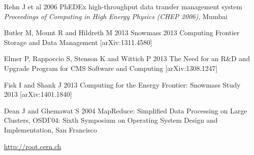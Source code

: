 \documentclass[a4paper]{jpconf}
\begin{document}
\begin{thebibliography}{9}
 Rehn J et al 2006 PhEDEx high-throughput data
  transfer management system {\it Proceedings of Computing in High
    Energy Physics (CHEP 2006)}, Mumbai

 Butler M, Mount R and Hildreth M 2013 Snowmass
  2013 Computing Frontier Storage and Data Management
  [arXiv:1311.4580]

 Elmer P, Rappoccio S, Stenson K and Wittich P 2013
  The Need for an R\&D and Upgrade Program for CMS Software and
  Computing [arXiv:1308.1247]

 Fisk I and Shank J 2013 Computing for the Energy
  Frontier: Snowmass Study 2013 [arXiv:1401.1840]

 Dean J and Ghemawat S 2004 MapReduce: Simplified Data Processing on Large Clusters, OSDI'04: Sixth Symposium on Operating System Design
and Implementation, San Francisco

 \url{http://root.cern.ch}

\end{thebibliography}
\end{document}
